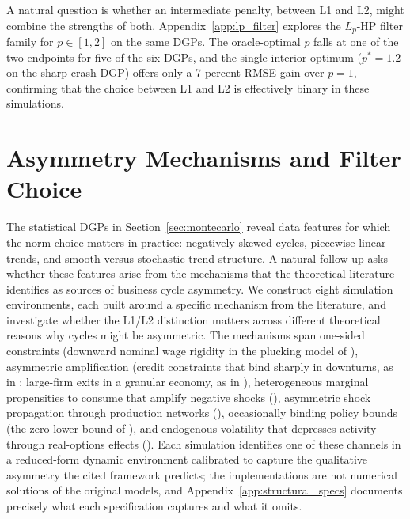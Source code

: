 \documentclass[10pt]{article}
\begin{document}
A natural question is whether an intermediate penalty, between L1 and L2, might combine the strengths of both. Appendix~\ref{app:lp_filter} explores the $L_p$-HP filter family for $p \in [1, 2]$ on the same DGPs. The oracle-optimal $p$ falls at one of the two endpoints for five of the six DGPs, and the single interior optimum ($p^* = 1.2$ on the sharp crash DGP) offers only a 7 percent RMSE gain over $p = 1$, confirming that the choice between L1 and L2 is effectively binary in these simulations.


\section{Asymmetry Mechanisms and Filter Choice}
\label{sec:structural}

The statistical DGPs in Section~\ref{sec:montecarlo} reveal data features for which the norm choice matters in practice: negatively skewed cycles, piecewise-linear trends, and smooth versus stochastic trend structure. A natural follow-up asks whether these features arise from the mechanisms that the theoretical literature identifies as sources of business cycle asymmetry. We construct eight simulation environments, each built around a specific mechanism from the literature, and investigate whether the L1/L2 distinction matters across different theoretical reasons why cycles might be asymmetric. The mechanisms span one-sided constraints (downward nominal wage rigidity in the plucking model of \citealt{dupraz_etal2020}), asymmetric amplification (credit constraints that bind sharply in downturns, as in \citealt{bernanke_etal1999}; large-firm exits in a granular economy, as in \citealt{gabaix2011}), heterogeneous marginal propensities to consume that amplify negative shocks (\citealt{kaplan_etal2018}), asymmetric shock propagation through production networks (\citealt{acemoglu_etal2012}), occasionally binding policy bounds (the zero lower bound of \citealt{eggertsson_woodford2003}), and endogenous volatility that depresses activity through real-options effects (\citealt{bloom2009}). Each simulation identifies one of these channels in a reduced-form dynamic environment calibrated to capture the qualitative asymmetry the cited framework predicts; the implementations are not numerical solutions of the original models, and Appendix~\ref{app:structural_specs} documents precisely what each specification captures and what it omits.
\end{document}
